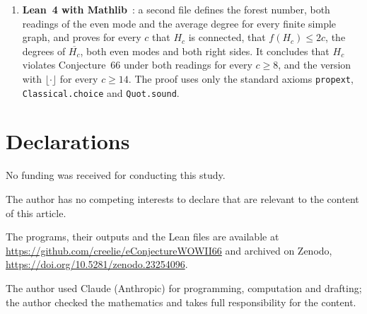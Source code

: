 \documentclass[10pt,a4paper]{article}
\providecommand{\doi}[1]{\url{https://doi.org/#1}}
\begin{document}
\begin{enumerate}
\item \textbf{Lean~4 with Mathlib}~\cite{Mathlib2020}: a second file defines the forest number, both readings of the even mode and the average degree for every finite simple graph, and proves for every $c$ that $H_c$ is connected, that $f(H_c)\le2c$, the degrees of $\overline{H_c}$, both even modes and both right sides. It concludes that $H_c$ violates Conjecture~66 under both readings for every $c\ge8$, and the version with $\lfloor\cdot\rfloor$ for every $c\ge14$. The proof uses only the standard axioms \texttt{propext}, \texttt{Classical.choice} and \texttt{Quot.sound}.
\end{enumerate}

\section*{Declarations}

 No funding was received for conducting this study.

 The author has no competing interests to declare that are relevant to the content of this article.

 The programs, their outputs and the Lean files are available at \url{https://github.com/creelie/eConjectureWOWII66} and archived on Zenodo, \doi{10.5281/zenodo.23254096}.

 The author used Claude (Anthropic) for programming, computation and drafting; the author checked the mathematics and takes full responsibility for the content.


\footnotesize
\end{document}
